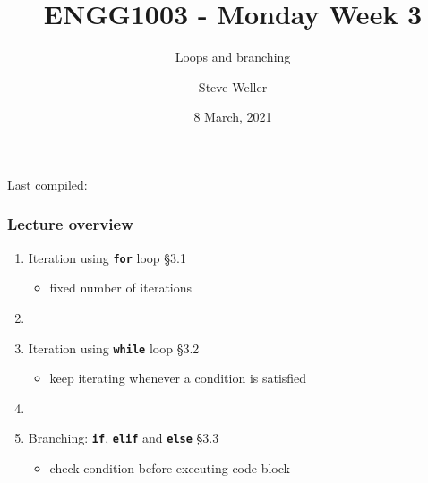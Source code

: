 \documentclass[english,14pt]{beamer}
\title{ENGG1003 - Monday Week 3}
\subtitle{Loops and branching}
\author{Steve Weller}
\institute{University of Newcastle}
\date{8 March, 2021}
\newcommand\red[1]{{\color{red} #1}}
\begin{document}
\begin{flushleft}
{\scriptsize Last compiled:~\DTMnow}
\vspace*{-5mm}
\end{flushleft}
\framebreak


\begin{frame}[fragile]

\frametitle{Lecture overview}
\begin{enumerate}
	\item Iteration using \textbf{\texttt{for}} loop \red{\S3.1}
	\begin{itemize}
		\item fixed number of iterations
	\end{itemize}

	\item[]
	
	\item Iteration using \textbf{\texttt{while}} loop \red{\S3.2}
		\begin{itemize}
			\item keep iterating whenever a condition is satisfied
		\end{itemize}

	\item[]
	
	\item Branching: \textbf{\texttt{if}}, \textbf{\texttt{elif}} and \textbf{\texttt{else}} \red{\S3.3}
		\begin{itemize}
			\item check condition before executing code block
		\end{itemize}
		
\end{enumerate}

\end{frame}

\end{document}
